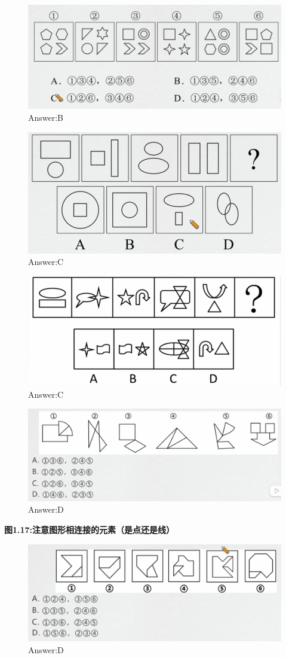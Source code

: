 \documentclass{article}
\numberwithin{equation}{section}						%
\numberwithin{figure}{section}							%
\begin{document}
\begin{sloppypar}
\begin{figure}[H]
     \centering
     \includegraphics[width=0.5\linewidth]{17.png}
		\caption{Answer:B}
\end{figure}

\begin{figure}[H]
     \centering
     \includegraphics[width=0.5\linewidth]{18.png}
		\caption{Answer:C}
\end{figure}


\begin{figure}[H]
     \centering
     \includegraphics[width=0.5\linewidth]{19.png}
		\caption{Answer:C}
\end{figure}

\begin{figure}[H]
     \centering
     \includegraphics[width=0.55\linewidth]{20.png}
		\caption{Answer:D}
\end{figure}

\textbf{图1.17:注意图形相连接的元素（是点还是线）}

\begin{figure}[H]
     \centering
     \includegraphics[width=0.55\linewidth]{21.png}
		\caption{Answer:D}
\end{figure}



\end{sloppypar}
\end{document}
